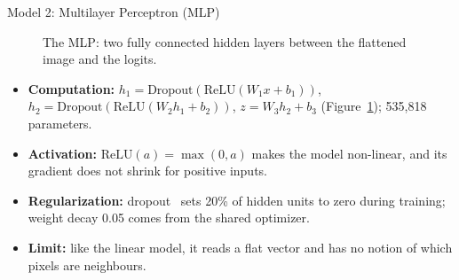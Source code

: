 \begin{frame}{Model 2: Multilayer Perceptron (MLP)}
\begin{figure}
\centering
{}
\caption{The MLP: two fully connected hidden layers between the flattened image and the logits.}
\label{fig:mlp}
\end{figure}

\vspace{-0.3cm}
\small
\begin{itemize}
    \item \textbf{Computation:} $h_1 = \mathrm{Dropout}(\mathrm{ReLU}(W_1 x + b_1))$,
          $h_2 = \mathrm{Dropout}(\mathrm{ReLU}(W_2 h_1 + b_2))$, $z = W_3 h_2 + b_3$ (Figure~\ref{fig:mlp});
          535{,}818 parameters.
    \item \textbf{Activation:} $\mathrm{ReLU}(a) = \max(0, a)$ makes the model non-linear, and its gradient
          does not shrink for positive inputs.
    \item \textbf{Regularization:} dropout~\cite{srivastava2014dropout} sets 20\% of hidden units to zero during training;
          weight decay 0.05 comes from the shared optimizer.
    \item \textbf{Limit:} like the linear model, it reads a flat vector and has no notion of which pixels are neighbours.
\end{itemize}
\end{frame}

